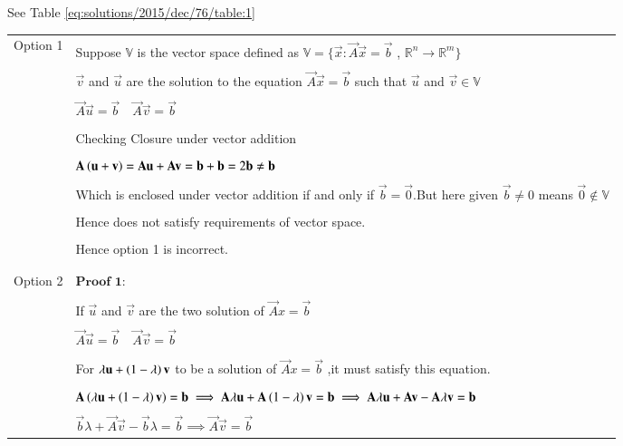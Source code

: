 See Table \ref{eq:solutions/2015/dec/76/table:1}

\onecolumn
\begin{longtable}{|l|l|}
\hline
\multirow{3}{*}{Option 1} & \\
&Suppose $\mathbb{V}$ is the vector space defined as $\mathbb{V}=\{\vec{x}:\vec{A}\vec{x}=\vec{b}$ , $\mathbb{R}^n\xrightarrow{}\mathbb{R}^m\}$\\
&\\
& $\vec{v}$ and $\vec{u}$ are the solution to the equation $\vec{A}\vec{x}=\vec{b}$  such that $\vec{u}$ and  $\vec{v}\in \mathbb{V}$\\
&\\
&$\vec{A}\vec{u}=\vec{b}\quad\vec{A}\vec{v}=\vec{b}$\\
&\\
&Checking Closure under vector addition\\
&\\
&$\mathbf{A}\left(\mathbf{u+v}\right)=\mathbf{A}\mathbf{u}+\mathbf{A}\mathbf{v}=\mathbf{b}+\mathbf{b}=2\mathbf{b}\neq\mathbf{b}$\\
&\\
&Which is enclosed under vector addition if and only if $\vec{b}=\vec{0}$.But here given $\vec{b}\neq0$ means $\vec{0} \not\in \mathbb{V}$\\
&\\
&Hence does not satisfy requirements of vector space.\\
&\\
&Hence option 1 is incorrect.\\
&\\
\hline
&\\
Option 2 &$\textbf{Proof 1:}$\\
&\\
&If $\vec{u}$ and $\vec{v}$ are the two solution of $\vec{A}x=\vec{b}$ \\
&\\
&$\vec{A}\vec{u}=\vec{b}\quad\vec{A}\vec{v}=\vec{b}$\\
&\\
&For $\lambda \mathbf{u}  +\left(1-\lambda\right)\mathbf{v}$ to be a solution of $\vec{A}x=\vec{b}$ ,it must satisfy this equation.\\
&\\
& $\mathbf{A}\left(\lambda\mathbf{u}  +\left(1-\lambda\right)\mathbf{v}\right)=\mathbf{b} \implies\mathbf{A}\lambda\mathbf{u} + \mathbf{A}\left(1-\lambda\right)\mathbf{v}=\mathbf{b}\implies\mathbf{A}\lambda\mathbf{u}+\mathbf{A}\mathbf{v}-\mathbf{A}\lambda\mathbf{v}=\mathbf{b}$\\
&\\
&$\vec{b}\lambda + \vec{A}\vec{v} -\vec{b}\lambda=\vec{b}\implies\vec{A}\vec{v}=\vec{b}$\\

\end{longtable}
